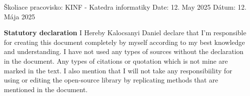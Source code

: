 \documentclass[english,12pt,oneside,a4paper]{article}
\begin{document}
	Školiace pracovisko: KINF - Katedra informatiky
	\newline
	Date: 12. May 2025
	\newline
	Dátum: 12. Mája 2025
	\newpage
	
	\newpage
	\textbf{Statutory declaration}
	\newline
	\newline
	I Hereby Kalocsanyi Daniel declare that I'm responsible for creating this document completely by myself according to my best knowledge and understanding. I have not used any types of sources without the declaration in the document. Any types of citations or quotation which is not mine are marked in the text. I also mention that I will not take any responsibiility for using or editing the open-source library by replicating methods that are mentioned in the document.
	\newpage
	\newpage
\end{document}
